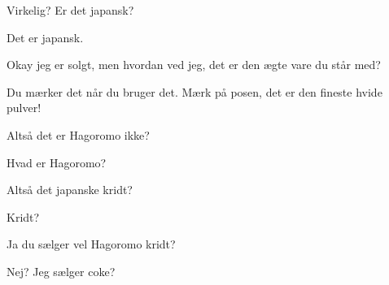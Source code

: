 \documentclass[a4paper,11pt]{article}
\begin{document}
\begin{sketch}
 Virkelig? Er det japansk? 

 Det er japansk. 

 Okay jeg er solgt, men hvordan ved jeg, det er den ægte vare du står med?

 Du mærker det når du bruger det. Mærk på posen, det er den fineste hvide pulver! 

 Altså det er Hagoromo ikke? 

 Hvad er Hagoromo? 

 Altså det japanske kridt? 

 Kridt? 

 Ja du sælger vel Hagoromo kridt? 

 Nej? Jeg sælger coke? 


\end{sketch}
\end{document}
